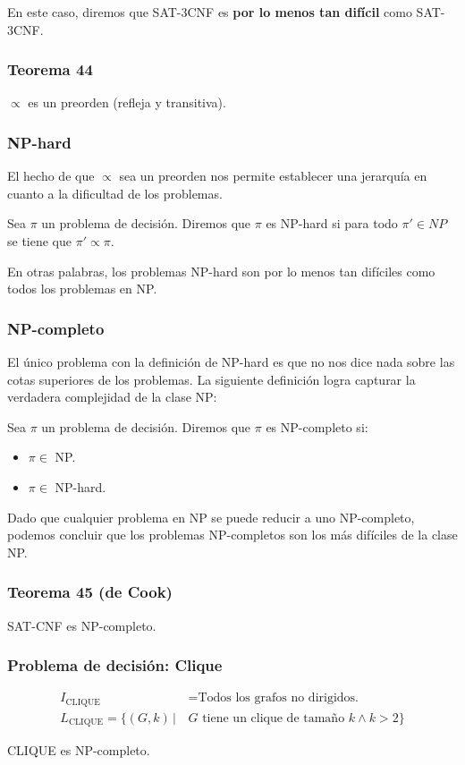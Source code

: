 \begin{multicols}{2}
    En este caso, diremos que SAT-3CNF es \textbf{por lo menos tan difícil} como SAT-3CNF.
    
    \subsubsection*{Teorema 44}
    $\propto$ es un preorden (refleja y transitiva).
    
    \subsubsection*{NP-hard}
    El hecho de que $\propto$ sea un preorden nos permite establecer una jerarquía en cuanto a la dificultad de los problemas. \p
    
    Sea $\pi$ un problema de decisión. Diremos que $\pi$ es NP-hard si para todo $\pi' \in NP$ se tiene que $\pi' \propto \pi$. \p
    
    En otras palabras, los problemas NP-hard son por lo menos tan difíciles como todos los problemas en NP.
    
    \subsubsection*{NP-completo}
    El único problema con la definición de NP-hard es que no nos dice nada sobre las cotas superiores de los problemas. La siguiente definición logra capturar la verdadera complejidad de la clase NP: \p
    
    Sea $\pi$ un problema de decisión. Diremos que $\pi$ es NP-completo si:
    \begin{itemize}
        \item $\pi \in$ NP.
        \item $\pi \in$ NP-hard.
    \end{itemize}
    Dado que cualquier problema en NP se puede reducir a uno NP-completo, podemos concluir que los problemas NP-completos son los más difíciles de la clase NP.
    
    \subsubsection*{Teorema 45 (de Cook)}
    SAT-CNF es NP-completo.
    
    \subsubsection*{Problema de decisión: Clique}
    \begin{align*}
        I_{\text{CLIQUE}} &= \text{Todos los grafos no dirigidos.} \\
        L_{\text{CLIQUE}} = \{ (G, k) \,|\, &G \text{ tiene un clique de tamaño } k \wedge k > 2 \}
    \end{align*}
    
    CLIQUE es NP-completo.
    
    
    \end{multicols}
    